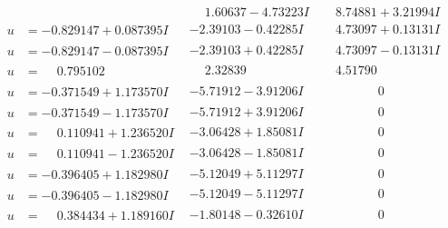 \documentclass[1p]{elsarticle_modified}
\theoremstyle{definition}
\begin{document}
$$\begin{array}{c|c|c}
 & \phantom{-}1.60637 - 4.73223 I & \phantom{-}8.74881 + 3.21994 I \\ \hline\begin{aligned}
u &= -0.829147 + 0.087395 I\end{aligned}
 & -2.39103 - 0.42285 I & \phantom{-}4.73097 + 0.13131 I \\ \hline\begin{aligned}
u &= -0.829147 - 0.087395 I\end{aligned}
 & -2.39103 + 0.42285 I & \phantom{-}4.73097 - 0.13131 I \\ \hline\begin{aligned}
u &= \phantom{-}0.795102\phantom{ +0.000000I}\end{aligned}
 & \phantom{-}2.32839\phantom{ +0.000000I} & \phantom{-}4.51790\phantom{ +0.000000I} \\ \hline\begin{aligned}
u &= -0.371549 + 1.173570 I\end{aligned}
 & -5.71912 - 3.91206 I & \phantom{-0.000000 } 0 \\ \hline\begin{aligned}
u &= -0.371549 - 1.173570 I\end{aligned}
 & -5.71912 + 3.91206 I & \phantom{-0.000000 } 0 \\ \hline\begin{aligned}
u &= \phantom{-}0.110941 + 1.236520 I\end{aligned}
 & -3.06428 + 1.85081 I & \phantom{-0.000000 } 0 \\ \hline\begin{aligned}
u &= \phantom{-}0.110941 - 1.236520 I\end{aligned}
 & -3.06428 - 1.85081 I & \phantom{-0.000000 } 0 \\ \hline\begin{aligned}
u &= -0.396405 + 1.182980 I\end{aligned}
 & -5.12049 + 5.11297 I & \phantom{-0.000000 } 0 \\ \hline\begin{aligned}
u &= -0.396405 - 1.182980 I\end{aligned}
 & -5.12049 - 5.11297 I & \phantom{-0.000000 } 0 \\ \hline\begin{aligned}
u &= \phantom{-}0.384434 + 1.189160 I\end{aligned}
 & -1.80148 - 0.32610 I & \phantom{-0.000000 } 0 \\ \hline\begin{aligned}

\end{aligned}
\end{array}$$
\end{document}
